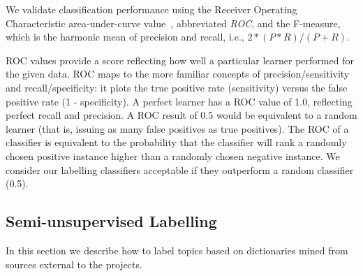 \documentclass[smallextended]{svjour3}       %
\begin{document}
We validate classification performance using the Receiver Operating
Characteristic area-under-curve value~\cite{Fawcett2006861},
abbreviated \emph{ROC}, and the F-measure, which is the harmonic mean of precision and recall, i.e., $2 * (P * R) / (P + R)$. 

ROC values provide a score %
 reflecting how well a particular learner performed for the given data. 
ROC maps to the more familiar concepts of precision/sensitivity and recall/specificity: it plots the true positive rate (sensitivity) versus the false positive rate (1 - specificity). 
A perfect learner has a ROC value of 1.0, reflecting perfect recall and precision. 
A ROC result of 0.5 would be equivalent to a random learner (that is, issuing as many false positives as true positives). 
The %
ROC of a classifier is equivalent to the probability that the classifier will rank a randomly chosen positive instance higher than a randomly chosen negative instance.
We consider our labelling classifiers acceptable if they outperform a random classifier (0.5). 

\subsection{Semi-unsupervised Labelling}
\label{sec:unsuplabelling}

In this section we describe how to label topics based on dictionaries
mined from sources external to the projects.


\end{document}
